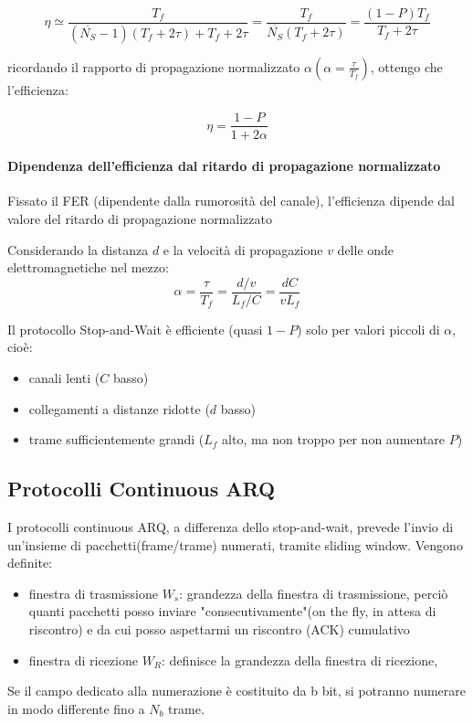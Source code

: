 \begin{equation}
\eta \simeq \frac{T_f}{(\overline{N_S} - 1)(T_f + 2\tau) + T_f + 2\tau} = \frac{T_f}{\overline{N_S}(T_f + 2\tau)} = \frac{(1-P)T_f}{T_f + 2\tau}
\end{equation}

ricordando il rapporto di propagazione normalizzato $\alpha(\alpha = \frac{\tau}{T_f} )$, ottengo che l'efficienza:

\begin{equation}
\eta = \frac{1 - P}{1 + 2\alpha}
\end{equation}

\paragraph{Dipendenza dell'efficienza dal ritardo di propagazione normalizzato}
Fissato il FER (dipendente dalla rumorosità del canale), l'efficienza dipende dal valore del ritardo di propagazione normalizzato

Considerando la distanza $d$ e la velocità di propagazione $v$ delle onde elettromagnetiche nel mezzo:
\[
\alpha = \frac{\tau}{T_f} = \frac{d/v}{L_f/C} = \frac{dC}{vL_f}
\]

Il protocollo Stop-and-Wait è efficiente (quasi $1-P$) solo per valori piccoli di $\alpha$, cioè:
\begin{itemize}
    \item canali lenti ($C$ basso) 
    \item collegamenti a distanze ridotte ($d$ basso) 
    \item trame sufficientemente grandi ($L_f$ alto, ma non troppo per non aumentare $P$)
\end{itemize}

\newpage
\subsection{Protocolli Continuous ARQ}
I protocolli continuous ARQ, a differenza dello stop-and-wait, prevede l'invio di un'insieme di pacchetti(frame/trame) numerati, tramite sliding window.
Vengono definite:
\begin{itemize}
    \item finestra di trasmissione $W_s$: grandezza della finestra di trasmissione, perciò quanti pacchetti posso inviare "consecutivamente"(on the fly, in attesa di riscontro) e da cui posso aspettarmi un riscontro (ACK) cumulativo
    \item finestra di ricezione  $W_R$: definisce la grandezza della finestra di ricezione, 
\end{itemize} 
Se il campo dedicato alla numerazione è costituito da b bit, si potranno
numerare in modo differente fino a $N_b$ trame. 

